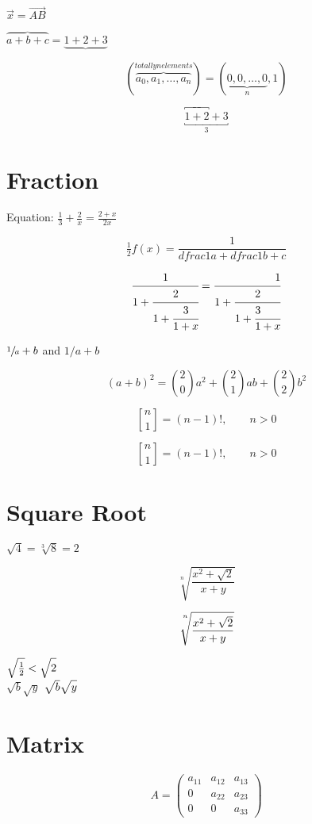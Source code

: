 \documentclass{article}
\newcommand\stiring[2]{\genfrac{[}{]}{0pt}{}{#1}{#2}}
\begin{document}
        $\vec x = \overrightarrow{AB}$

        $\overbrace{a+b+c} = \underbrace{1+2+3}$

        \[
            ( \overbrace{a_0,a_1,\dots,a_n}^{totally n elements} ) = 
            ( \underbrace{0,0,\dots,0}_{n},1 )
        \]

        \[
            \underbracket{\overbracket{1+2}+3}_3    
        \]

    \section{Fraction}
        Equation: $\frac 13 + \frac 2x = \frac{2+x}{2x}$

        \[
            \tfrac 12 f(x) =
            \frac{1}{dfrac 1a + dfrac 1b +c}
        \]

        \[
            \cfrac{1}{1+\cfrac{2}{1+\cfrac{3}{1+x}}} = 
            \cfrac[r]{1}{1+\cfrac[c]{2}{1+\cfrac[l]{3}{1+x}}}    
        \]

        $\sfrac 1a + b$ and $1/a + b$

        \[
            (a+b)^2 = \binom 20 a^2 + \binom 21 ab + \binom 22 b^2
        \]

        \[
            \genfrac{[}{]}{0pt}{}{n}{1} = (n-1)!, \qquad n > 0 
        \]

        \[
            \stiring{n}{1} = (n-1)!, \qquad n > 0 
        \]

    \section{Square Root}
        $\sqrt 4 = \sqrt[3]{8} =2$

        \[
            \sqrt[n]{\frac{x^2 + \sqrt 2}{x + y}}    
        \]

        \[
            \sqrt[\uproot{16}\leftroot{-2}n]{\frac{x^2 + \sqrt 2}{x + y}}    
        \]

        $\sqrt{\frac 12} < \sqrt{\vphantom{\frac 12} 2}$\\
        $\sqrt b \sqrt y$ \qquad 
        $\sqrt{\mathstrut b} \sqrt{\mathstrut y}$

    \section{Matrix}
        \[
            A = \begin{pmatrix}             %
            a_{11} & a_{12} & a_{13} \\
            0 & a_{22} & a_{23} \\
            0 & 0 & a_{33}
            \end{pmatrix}    
        \]
\end{document}
